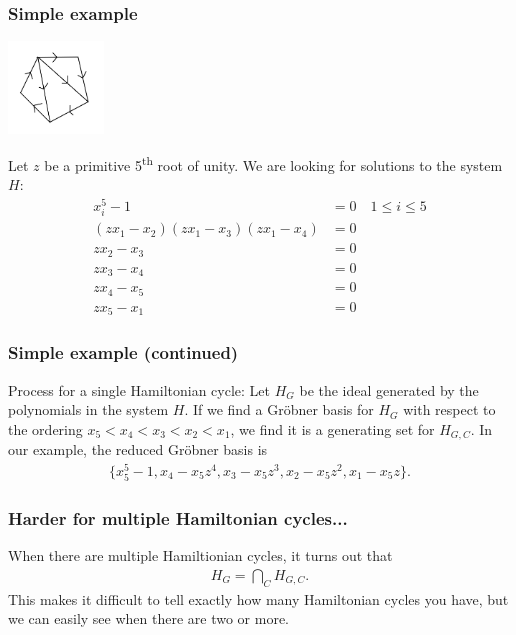 \documentclass{beamer}
\begin{document}
\begin{frame}
\frametitle{Simple example}
\begin{center}
  \includegraphics[width=1in]{pent2.png}
\end{center}
Let $z$ be a primitive 5\textsuperscript{th} root of unity. We are looking for solutions to the system $H$:
\begin{align*}
  x_i^5 - 1 &= 0 \quad 1 \leq i \leq 5\\
  (z x_1 - x_2) (z x_1 - x_3) (z x_1 - x_4) &= 0\\
  z x_2 - x_3 &= 0\\
  z x_3 - x_4 &= 0\\
  z x_4 - x_5 &= 0\\
  z x_5 - x_1 &= 0
\end{align*}
\end{frame}

\begin{frame}
\frametitle{Simple example (continued)}
Process for a single Hamiltonian cycle: Let $H_G$ be the ideal generated by the polynomials in the system $H$. If we find a Gr\"obner basis for $H_G$ with respect to the ordering $x_5 < x_4 < x_3 < x_2 < x_1$, we find it is a generating set for $H_{G,C}$. In our example, the reduced Gr\"obner basis is
\begin{align*}
  \{x_5^5 - 1, x_4 - x_5 z^4, x_3 - x_5 z^3, x_2 - x_5 z^2, x_1 - x_5 z\}.
\end{align*}
\end{frame}

\begin{frame}
\frametitle{Harder for multiple Hamiltonian cycles...}
When there are multiple Hamiltionian cycles, it turns out that
\begin{align*}
  H_G = \bigcap_{C} H_{G,C}.
\end{align*}
This makes it difficult to tell exactly how many Hamiltonian cycles you have, but we can easily see when there are two or more.
\end{frame}
\end{document}
